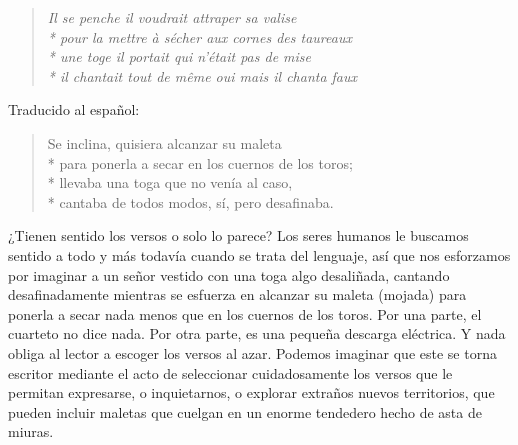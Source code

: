 \documentclass[11pt,a4paper]{article}
\begin{document}
%
%
%
%
%
%

\begin{verse}
\itshape
Il se penche il voudrait attraper sa valise\\*
pour la mettre à sécher aux cornes des taureaux\\*
une toge il portait qui n’était pas de mise\\*
il chantait tout de même oui mais il chanta faux
\end{verse}

Traducido al español:

\begin{verse}
Se inclina, quisiera alcanzar su maleta\\*
para ponerla a secar en los cuernos de los toros;\\*
llevaba una toga que no venía al caso,\\*
cantaba de todos modos, sí, pero desafinaba.
\end{verse}

¿Tienen sentido los versos o solo lo parece? Los seres humanos le buscamos sentido a todo y más todavía cuando se trata del lenguaje, así que nos esforzamos por imaginar a un señor vestido con una toga algo desaliñada, cantando desafinadamente mientras se esfuerza en alcanzar su maleta (mojada) para ponerla a secar nada menos que en los cuernos de los toros. Por una parte, el cuarteto no dice nada. Por otra parte, es una pequeña descarga eléctrica. Y nada obliga al lector a escoger los versos al azar. Podemos imaginar que este se torna escritor mediante el acto de seleccionar cuidadosamente los versos que le permitan expresarse, o inquietarnos, o explorar extraños nuevos territorios, que pueden incluir maletas que cuelgan en un enorme tendedero hecho de asta de miuras. 
\end{document}
